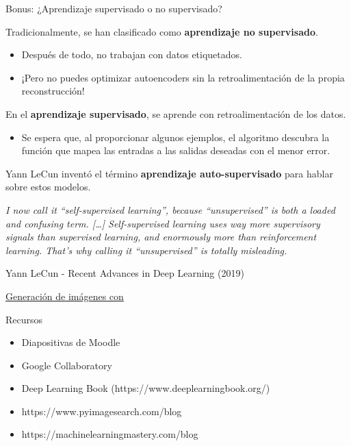 \begin{frame}{Bonus: ¿Aprendizaje supervisado o no supervisado?}

Tradicionalmente, se han clasificado como \textbf{aprendizaje no supervisado}.

\begin{itemize}
    \item Después de todo, no trabajan con datos etiquetados.
    \item ¡Pero no puedes optimizar autoencoders sin la retroalimentación de la propia reconstrucción!
\end{itemize}

En el \textbf{aprendizaje supervisado}, se aprende con retroalimentación de los datos.

\begin{itemize}
    \item Se espera que, al proporcionar algunos ejemplos, el algoritmo descubra la función que mapea las entradas a las salidas deseadas con el menor error.
\end{itemize}

Yann LeCun inventó el término \textbf{aprendizaje auto-supervisado} para hablar sobre estos modelos.
\end{frame}

\begin{frame}

{\Large\it I now call it ``self-supervised learning'', because ``unsupervised'' is both a loaded and confusing term. [\ldots] Self-supervised learning uses way more supervisory signals than supervised learning, and enormously more than reinforcement learning. That's why calling it ``unsupervised'' is totally misleading.}

\begin{flushright}
Yann LeCun - Recent Advances in Deep Learning (2019)
\end{flushright}
\end{frame}

\begin{exercise}
\href{https://colab.research.google.com/drive/11KvEtZmi33OrZVFO9uP9d68-nQrwfO-9}{Generación de imágenes con }
\end{exercise}


\begin{frame}{Recursos}
\begin{itemize}
    \item Diapositivas de Moodle
    \item Google Collaboratory
    \item Deep Learning Book (https://www.deeplearningbook.org/)
    \item https://www.pyimagesearch.com/blog
    \item https://machinelearningmastery.com/blog
\end{itemize}
\end{frame}


